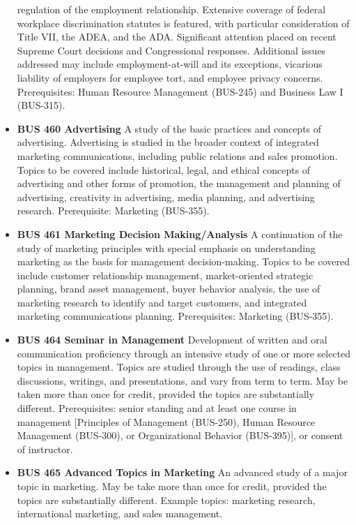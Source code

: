 \documentclass[
  letterpaper,
]{scrbook}
\begin{document}
\begin{itemize}
  regulation of the employment relationship. Extensive coverage of
  federal workplace discrimination statutes is featured, with particular
  consideration of Title VII, the ADEA, and the ADA. Significant
  attention placed on recent Supreme Court decisions and Congressional
  responses. Additional issues addressed may include employment-at-will
  and its exceptions, vicarious liability of employers for employee
  tort, and employee privacy concerns. Prerequisites: Human Resource
  Management (BUS-245) and Business Law I (BUS-315).
\item
  \textbf{BUS 460 Advertising} A study of the basic practices and
  concepts of advertising. Advertising is studied in the broader context
  of integrated marketing communications, including public relations and
  sales promotion. Topics to be covered include historical, legal, and
  ethical concepts of advertising and other forms of promotion, the
  management and planning of advertising, creativity in advertising,
  media planning, and advertising research. Prerequisite: Marketing
  (BUS-355).
\item
  \textbf{BUS 461 Marketing Decision Making/Analysis} A continuation of
  the study of marketing principles with special emphasis on
  understanding marketing as the basis for management decision-making.
  Topics to be covered include customer relationship management,
  market-oriented strategic planning, brand asset management, buyer
  behavior analysis, the use of marketing research to identify and
  target customers, and integrated marketing communications planning.
  Prerequisites: Marketing (BUS-355).
\item
  \textbf{BUS 464 Seminar in Management} Development of written and oral
  communication proficiency through an intensive study of one or more
  selected topics in management. Topics are studied through the use of
  readings, class discussions, writings, and presentations, and vary
  from term to term. May be taken more than once for credit, provided
  the topics are substantially different. Prerequisites: senior standing
  and at least one course in management {[}Principles of Management
  (BUS-250), Human Resource Management (BUS-300), or Organizational
  Behavior (BUS-395){]}, or consent of instructor.
\item
  \textbf{BUS 465 Advanced Topics in Marketing} An advanced study of a
  major topic in marketing. May be take more than once for credit,
  provided the topics are substantially different. Example topics:
  marketing research, international marketing, and sales management.

\end{itemize}
\end{document}
